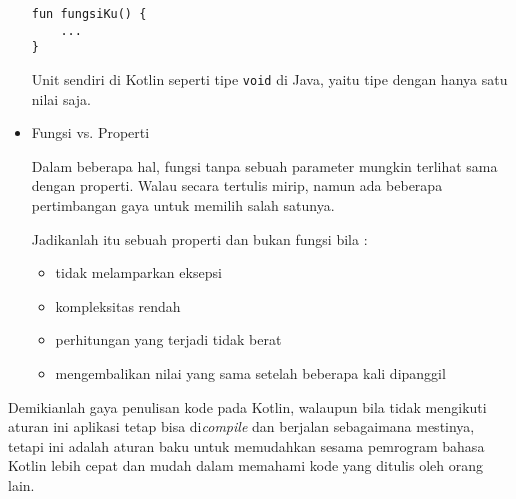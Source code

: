 \begin{itemize}
\begin{lstlisting}
fun fungsiKu() {
    ...
}
\end{lstlisting}	

Unit sendiri di Kotlin seperti tipe \texttt{void} di Java, yaitu tipe dengan hanya satu nilai saja.
	
	\item Fungsi vs. Properti
	
Dalam beberapa hal, fungsi tanpa sebuah parameter mungkin terlihat sama dengan properti. Walau secara tertulis mirip, namun ada beberapa pertimbangan gaya untuk memilih salah satunya.

Jadikanlah itu sebuah properti dan bukan fungsi bila :

		\begin{itemize}
			\item tidak melamparkan eksepsi
			\item kompleksitas rendah
			\item perhitungan yang terjadi tidak berat
			\item mengembalikan nilai yang sama setelah beberapa kali dipanggil
		\end{itemize}	
	
\end{itemize}

Demikianlah gaya penulisan kode pada Kotlin, walaupun bila tidak mengikuti aturan ini aplikasi tetap bisa di\textit{compile} dan berjalan sebagaimana mestinya, tetapi ini adalah aturan baku untuk memudahkan sesama pemrogram bahasa Kotlin lebih cepat dan mudah dalam memahami kode yang ditulis oleh orang lain.